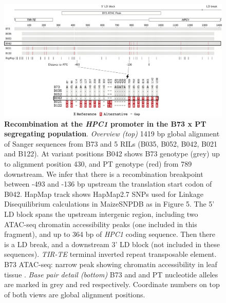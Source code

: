 \documentclass[9pt,twocolumn,twoside,lineno]{biorxiv}
\newcommand{\hpc}{\textit{HPC1}\xspace}
\begin{document}
\begin{figure}[t]
\begin{center}
\includegraphics[width=0.8\paperwidth]{Sup_Figures/Sup_Fig_6.png}
\caption{\textbf{Recombination at the \hpc promoter in the B73 x PT segregating population}. \textit{Overview (top)} 1419 bp global alignment of Sanger sequences from B73 and 5 RILs (B035, B052, B042, B021 and B122). At variant positions B042 shows B73 genotype (grey) up to alignment position 430, and PT genotype (red) from 789 downstream. We infer that there is  a recombination breakpoint between -493 and -136 bp upstream the translation start codon of B042.
HapMap track shows HapMap2.7 SNPs used for Linkage Disequilibrium calculations in MaizeSNPDB as in Figure 5. The 5' LD block spans the upstream intergenic region, including two ATAC-seq chromatin accessibility peaks (one included in this fragment), and up to 364 bp of \hpc coding sequence. 
Then there is a LD break, and a downstream 3' LD block (not included in these sequences). 
\textit{TIR-TE} terminal inverted repeat transposable element. 
B73 ATAC-seq: narrow peak showing chromatin accessibility in leaf tissue \cite{Ricci2019-zj}.
\textit{Base pair detail (bottom)} B73 and and PT nucleotide alleles are marked in grey and red respectively.
Coordinate numbers on top of both views are global alignment positions.
}
\label{figure:Sup:hpc1_promoter}
\end{center}
\end{figure} 


\clearpage
\end{document}

